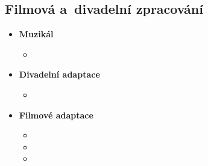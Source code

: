 \subsection{Filmová a~divadelní zpracování}
\begin{itemize}
    \item \textbf{Muzikál}
    \begin{itemize}
        \item
    \end{itemize}

    \item \textbf{Divadelní adaptace}
    \begin{itemize}
        \item
    \end{itemize}

    \item \textbf{Filmové adaptace}
    \begin{itemize}
        \item
        \item
        \item
    \end{itemize}

\end{itemize}

\newpage

